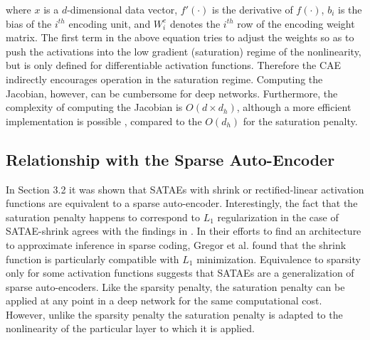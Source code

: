 \noindent where $x$ is a $d$-dimensional data vector, $f'(\cdot)$ is the
derivative of $f(\cdot)$, $b_i$ is the bias of the $i^{th}$ encoding unit, and
$W^e_i$ denotes the $i^{th}$ row of the encoding weight matrix. The first term
in the above equation tries to adjust the weights so as to push the activations
into the low gradient (saturation) regime of the nonlinearity, but is only
defined for differentiable activation functions. Therefore the CAE indirectly
encourages operation in the saturation regime. Computing the Jacobian, however,
can be cumbersome for deep networks. Furthermore, the complexity of computing
the Jacobian is $O(d \times d_h)$, although a more efficient implementation is
possible \cite{CAE}, compared to the $O(d_h)$ for the saturation penalty.  
 
\subsection{Relationship with the Sparse Auto-Encoder} In Section 3.2 it was
shown that SATAEs with shrink or rectified-linear activation functions are
equivalent to a sparse auto-encoder. Interestingly, the fact that the
saturation penalty happens to correspond to $L_1$ regularization in the case of
SATAE-shrink agrees with the findings in \cite{LISTA}. In their efforts to find
an architecture to approximate inference in sparse coding, Gregor et al. found
that the shrink function is particularly compatible with $L_1$ minimization.
Equivalence to sparsity only for some activation functions suggests that SATAEs
are a generalization of sparse auto-encoders. Like the sparsity penalty, the
saturation penalty can be applied at any point in a deep network for the same
computational cost. However, unlike the sparsity penalty the saturation penalty
is adapted to the nonlinearity of the particular layer to which it is applied. 

